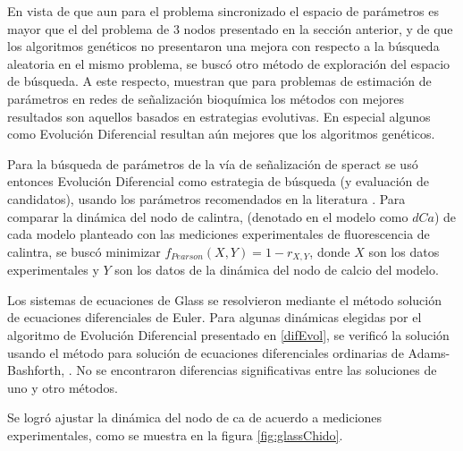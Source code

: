En vista de que aun para el problema sincronizado el espacio de parámetros es mayor que el del problema de 3 nodos presentado en la sección anterior, y de que los algoritmos genéticos no presentaron una mejora con respecto a la búsqueda aleatoria en el mismo problema, se buscó otro método de exploración del espacio de búsqueda. A este respecto, \citeauthor{BangaMoles2003} \citep{BangaMoles2003} muestran que para problemas de estimación de parámetros en redes de señalización bioquímica los métodos con mejores resultados son aquellos basados en estrategias evolutivas. En especial algunos como Evolución Diferencial resultan aún mejores que los algoritmos genéticos.

Para la búsqueda de parámetros de la vía de señalización de speract se usó entonces Evolución Diferencial como estrategia de búsqueda (y evaluación de candidatos), usando los parámetros recomendados en la literatura \citeauthor{Storn1997}  \citep{Storn1997}. Para comparar la dinámica del nodo de \ac{calintra}, (denotado en el modelo como $dCa$) de cada modelo planteado con las mediciones experimentales de fluorescencia de \ac{calintra}, se buscó minimizar $f_{Pearson}(X,Y) = 1-r_{X,Y}$, donde $X$ son los datos experimentales y $Y$ son los datos de la dinámica del nodo de calcio del modelo. 

Los sistemas de ecuaciones de Glass se resolvieron mediante el método solución de ecuaciones diferenciales de Euler. Para algunas dinámicas elegidas por el algoritmo de Evolución Diferencial presentado en \ref{difEvol}, se verificó la solución usando el método para solución de ecuaciones diferenciales ordinarias de Adams-Bashforth, \citeauthor{gslManual} \citep{gslManual}. No se encontraron diferencias significativas entre las soluciones de uno y otro métodos.

Se logró ajustar la dinámica del nodo de \ac{ca} de acuerdo a mediciones experimentales, como se muestra en la figura \ref{fig:glassChido}. 

